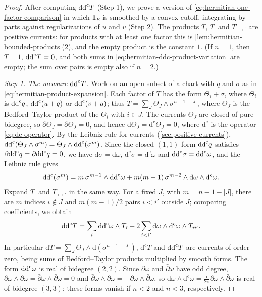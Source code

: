 \begin{proof}
After computing $\mathrm{dd}^{\mathrm{c}} T$ (Step 1), we prove a version of \eqref{eq:hermitian-one-factor-comparison} in which $\mathbf1_E$ is smoothed by a convex cutoff, integrating by parts against regularizations of $u$ and $v$ (Step 2). The products $T$, $T_{\hat\imath}$ and $T_{\hat\imath\hat\imath'}$ are positive currents: for products with at least one factor this is \cref{lem:hermitian-bounded-products}(2), and the empty product is the constant $1$. (If $n=1$, then $T=1$, $\mathrm{dd}^{\mathrm{c}} T=0$, and both sums in \eqref{eq:hermitian-ddc-product-variation} are empty; the sum over pairs is empty also if $n=2$.)

\emph{Step 1. The measure $\mathrm{dd}^{\mathrm{c}} T$.} Work on an open subset of a chart with $q$ and $\sigma$ as in \eqref{eq:hermitian-product-expansion}. Each factor of $T$ has the form $\Theta_i+\sigma$, where $\Theta_i$ is $\mathrm{dd}^{\mathrm{c}} q$, $\mathrm{dd}^{\mathrm{c}}(u+q)$ or $\mathrm{dd}^{\mathrm{c}}(v+q)$; thus $T=\sum_J\Theta_J\wedge\sigma^{n-1-|J|}$, where $\Theta_J$ is the Bedford--Taylor product of the $\Theta_i$ with $i\in J$. The currents $\Theta_J$ are closed of pure bidegree, so $\partial\Theta_J=\bar\partial\Theta_J=0$, and hence $\mathrm d\Theta_J=\mathrm d^{\mathrm c}\Theta_J=0$, where $\mathrm d^{\mathrm c}$ is the operator \eqref{eq:dc-operator}. By the Leibniz rule for currents (\cref{sec:positive-currents}), $\mathrm{dd}^{\mathrm{c}}(\Theta_J\wedge\sigma^m)=\Theta_J\wedge\mathrm{dd}^{\mathrm{c}}(\sigma^m)$. Since the closed $(1,1)$-form $\mathrm{dd}^{\mathrm{c}} q$ satisfies $\partial\mathrm{dd}^{\mathrm{c}} q=\bar\partial\mathrm{dd}^{\mathrm{c}} q=0$, we have $\mathrm d\sigma=\mathrm d\omega$, $\mathrm d^{\mathrm c}\sigma=\mathrm d^{\mathrm c}\omega$ and $\mathrm{dd}^{\mathrm{c}}\sigma=\mathrm{dd}^{\mathrm{c}}\omega$, and the Leibniz rule gives
\[
 \mathrm{dd}^{\mathrm{c}}(\sigma^m)=m\,\sigma^{m-1}\wedge\mathrm{dd}^{\mathrm{c}}\omega+m(m-1)\,\sigma^{m-2}\wedge\mathrm d\omega\wedge\mathrm d^{\mathrm c}\omega.
\]
Expand $T_{\hat\imath}$ and $T_{\hat\imath\hat\imath'}$ in the same way. For a fixed $J$, with $m=n-1-|J|$, there are $m$ indices $i\notin J$ and $m(m-1)/2$ pairs $i<i'$ outside $J$; comparing coefficients, we obtain
\begin{equation}\label{eq:hermitian-ddc-product}
 \mathrm{dd}^{\mathrm{c}} T=\sum_i\mathrm{dd}^{\mathrm{c}}\omega\wedge T_{\hat\imath}
      +2\sum_{i<i'}\mathrm d\omega\wedge\mathrm d^{\mathrm c}\omega\wedge T_{\hat\imath\hat\imath'}.
\end{equation}
In particular $\mathrm dT=\sum_J\Theta_J\wedge\mathrm d(\sigma^{n-1-|J|})$, $\mathrm d^{\mathrm c}T$ and $\mathrm{dd}^{\mathrm{c}} T$ are currents of order zero, being sums of Bedford--Taylor products multiplied by smooth forms. The form $\mathrm{dd}^{\mathrm{c}}\omega$ is real of bidegree $(2,2)$. Since $\partial\omega$ and $\bar\partial\omega$ have odd degree, $\partial\omega\wedge\partial\omega=\bar\partial\omega\wedge\bar\partial\omega=0$ and $\bar\partial\omega\wedge\partial\omega=-\partial\omega\wedge\bar\partial\omega$, so $\mathrm d\omega\wedge\mathrm d^{\mathrm c}\omega=\frac{\mathrm i}{2\pi}\partial\omega\wedge\bar\partial\omega$ is real of bidegree $(3,3)$; these forms vanish if $n<2$ and $n<3$, respectively.


\end{proof}
